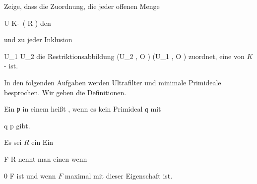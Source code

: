 {}
{





Zeige, dass die Zuordnung, die jeder offenen Menge

\mavergleichskette
{\vergleichskette
{U
}
{ \subseteq }{ K\!-\!\, \left(   R   \right)
}
{  }{
}
{    }{
}
{   }{
}
}
{}{}{}
den

 und zu jeder Inklusion

\mavergleichskette
{\vergleichskette
{U_1
}
{ \subseteq }{ U_2
}
{  }{
}
{    }{
}
{   }{
}
}
{}{}{}
die Restriktionsabbildung
 {} {}
\maabbdisp {} { \Gamma (U_2 , {\mathcal O} ) } { \Gamma (U_1 , {\mathcal O} )
} {}
zuordnet, eine
von
$K$-
ist.





}
{} {}

In den folgenden Aufgaben werden Ultrafilter und minimale Primideale besprochen. Wir geben die Definitionen.





Ein 
${\mathfrak p}$
in einem 
heißt , wenn es kein Primideal ${\mathfrak q}$ mit

\mavergleichskette
{\vergleichskette
{ {\mathfrak q}
}
{ \subset }{ {\mathfrak p}
}
{  }{
}
{    }{
}
{   }{
}
}
{}{}{}
gibt.











Es sei $R$ ein
Ein

\mavergleichskette
{\vergleichskette
{ F
}
{ \subseteq }{ R
}
{  }{
}
{    }{
}
{   }{
}
}
{}{}{}
nennt man einen  wenn

\mavergleichskette
{\vergleichskette
{ 0
}
{ \notin }{ F
}
{  }{
}
{    }{
}
{   }{
}
}
{}{}{}
ist und wenn $F$ maximal mit dieser Eigenschaft ist.







